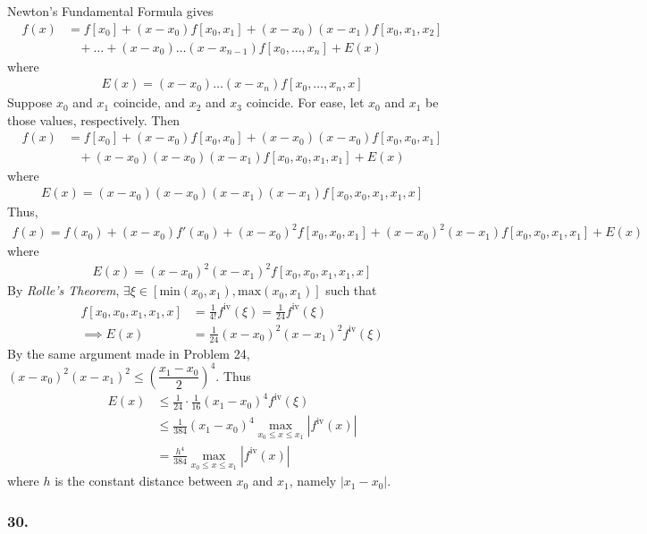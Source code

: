 \documentclass[12pt]{article}
\begin{document}
\noindent Newton's Fundamental Formula gives
\begin{align*}
f(x) &= f[x_0] + (x - x_0)f[x_0, x_1] + (x - x_0)(x - x_1)f[x_0, x_1, x_2] \\
&\ \ \ \ + \dots + (x - x_0)\dots(x - x_{n-1})f[x_0,\dots,x_n] + E(x)
\end{align*}
where
\begin{align*}
E(x) = (x - x_0)\dots(x - x_n)f[x_0, \dots, x_n, x]
\end{align*}
Suppose $x_0$ and $x_1$ coincide, and $x_2$ and $x_3$ coincide.  For ease, let $x_0$ and $x_1$ be those values, respectively.  Then
\begin{align*}
f(x) &= f[x_0] + (x - x_0)f[x_0, x_0] + (x - x_0)(x - x_0)f[x_0, x_0, x_1] \\
&\ \ \ \ + (x - x_0)(x - x_0)(x - x_1)f[x_0, x_0, x_1, x_1] + E(x)
\end{align*}
where
\begin{align*}
E(x) = (x - x_0)(x - x_0)(x - x_1)(x - x_1)f[x_0, x_0, x_1, x_1, x]
\end{align*}
Thus,
\begin{align*}
f(x) = f(x_0) + (x - x_0)f'(x_0) + (x - x_0)^2f[x_0, x_0, x_1] + (x - x_0)^2(x - x_1)f[x_0, x_0, x_1, x_1] + E(x)
\end{align*}
where
\begin{align*}
E(x) = (x - x_0)^2(x - x_1)^2f[x_0, x_0, x_1, x_1, x]
\end{align*}
By {\it Rolle's Theorem}, $\exists \xi \in [\text{min}(x_0, x_1), \text{max}(x_0, x_1)]$ such that
\begin{align*}
f[x_0, x_0, x_1, x_1, x] &= \frac{1}{4!}f^{\text{iv}}(\xi) = \frac{1}{24}f^{\text{iv}}(\xi) \\[.1cm]
\implies E(x) &= \frac{1}{24}(x - x_0)^2(x - x_1)^2f^{\text{iv}}(\xi)
\end{align*}
By the same argument made in Problem 24, $(x - x_0)^2(x - x_1)^2 \leq \left(\dfrac{x_1 - x_0}{2}\right)^4$.  Thus
\begin{align*}
E(x) &\leq \frac{1}{24}\cdot\frac{1}{16}(x_1 - x_0)^4 f^{\text{iv}}(\xi) \\
&\leq \frac{1}{384}(x_1 - x_0)^4 \max\limits_{x_0 \leq x \leq x_1} |f^{\text{iv}}(x)| \\
&= \frac{h^4}{384}\max\limits_{x_0 \leq x \leq x_1} |f^{\text{iv}}(x)|
\end{align*}
where $h$ is the constant distance between $x_0$ and $x_1$, namely $|x_1 - x_0|$.

\subsubsection*{30.}
\end{document}
